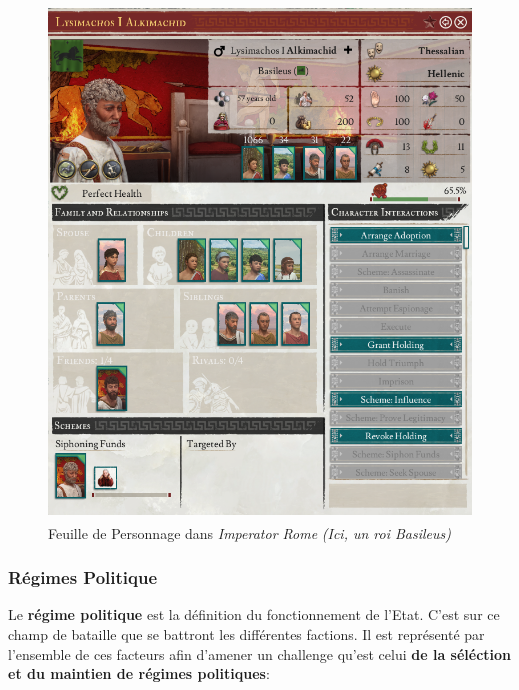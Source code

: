 \documentclass{article}
\def\reg{\small{\textsuperscript{\textregistered}}}
\begin{document}
                \begin{figure}[h]
                    \centering
                        \includegraphics[scale=0.3]{image_ir_personnage.png}
                        \caption{Feuille de Personnage dans \textit{Imperator Rome\reg} \textit{(Ici, un roi Basileus)}}
                        \label{fig:x photosysteme}
                \end{figure}
                
            \subsubsection{Régimes Politique}
                Le \textbf{régime politique} est la définition du fonctionnement de l'Etat. C'est sur ce champ de bataille que se battront les différentes factions. Il est représenté par l'ensemble de ces facteurs afin d'amener un challenge qu'est celui \textbf{de la séléction et du maintien de régimes politiques}:
                
\end{document}
